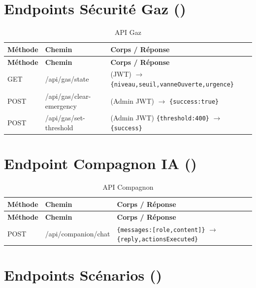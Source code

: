 \section{Endpoints Sécurité Gaz ()}

\begin{longtable}{p{} p{} p{}}
\caption{API Gaz}\label{tab:api_gas}\\
\toprule
\textbf{Méthode} & \textbf{Chemin} & \textbf{Corps / Réponse} \\
\midrule
\endfirsthead
\toprule
\textbf{Méthode} & \textbf{Chemin} & \textbf{Corps / Réponse} \\
\midrule
\endhead
\bottomrule
\endfoot
GET  & /api/gas/state           & (JWT) $\to$ \texttt{\{niveau,seuil,vanneOuverte,urgence\}} \\
POST & /api/gas/clear-emergency & (Admin JWT) $\to$ \texttt{\{success:true\}} \\
POST & /api/gas/set-threshold   & (Admin JWT) \texttt{\{threshold:400\}} $\to$ \texttt{\{success\}} \\
\end{longtable}

\section{Endpoint Compagnon IA ()}

\begin{longtable}{p{} p{} p{}}
\caption{API Compagnon}\label{tab:api_companion}\\
\toprule
\textbf{Méthode} & \textbf{Chemin} & \textbf{Corps / Réponse} \\
\midrule
\endfirsthead
\toprule
\textbf{Méthode} & \textbf{Chemin} & \textbf{Corps / Réponse} \\
\midrule
\endhead
\bottomrule
\endfoot
POST & /api/companion/chat & \texttt{\{messages:[{role,content}]\}} $\to$ \texttt{\{reply,actionsExecuted\}} \\
\end{longtable}

\section{Endpoints Scénarios ()}

